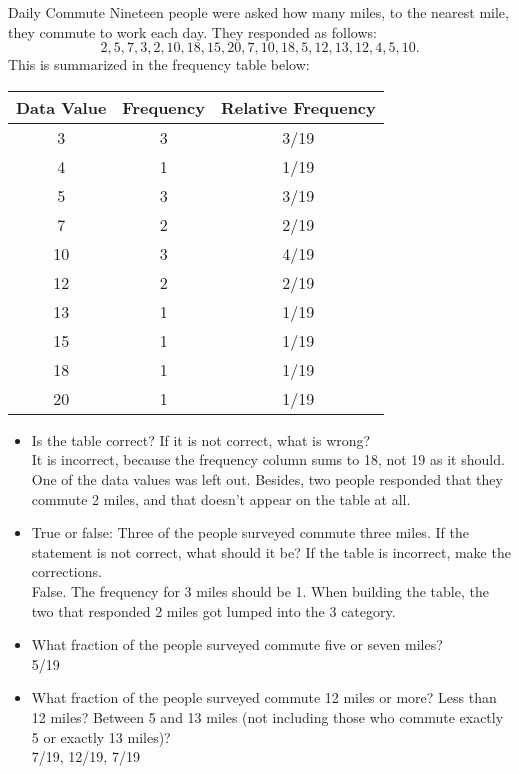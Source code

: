 \begin{example}[https://www.youtube.com/watch?v=VQhKtct3nog]{Daily Commute}
Nineteen people were asked how many miles, to the nearest mile, they commute to work each day. They responded as follows: \[2, 5, 7, 3, 2, 10, 18, 15, 20, 7, 10, 18, 5, 12, 13, 12, 4, 5, 10.\] This is summarized in the frequency table below:

\begin{center}
\begin{tabular}{c | c | c}
\textbf{Data Value} & \textbf{Frequency} & \textbf{Relative Frequency}\\
\hline
3 & 3 & 3/19 \\
4 & 1 & 1/19 \\
5 & 3 & 3/19 \\
7 & 2 & 2/19 \\
10 & 3 & 4/19 \\
12 & 2 & 2/19 \\
13 & 1 & 1/19 \\
15 & 1 & 1/19 \\
18 & 1 & 1/19 \\
20 & 1 & 1/19  
\end{tabular}
\end{center}

\begin{itemize}
\item Is the table correct? If it is not correct, what is wrong?\\

It is incorrect, because the frequency column sums to 18, not 19 as it should.  One of the data values was left out.  Besides, two people responded that they commute 2 miles, and that doesn't appear on the table at all.\\

\item True or false: Three of the people surveyed commute three miles. If the statement is not correct, what should it be? If the table is incorrect, make the corrections.\\

False.  The frequency for 3 miles should be 1.  When building the table, the two that responded 2 miles got lumped into the 3 category.\\

\item What fraction of the people surveyed commute five or seven miles?\\

5/19\\

\item What fraction of the people surveyed commute 12 miles or more? Less than 12 miles? Between 5 and 13 miles (not including those who commute exactly 5 or exactly 13 miles)?\\

7/19, 12/19, 7/19
\end{itemize}
\end{example}

